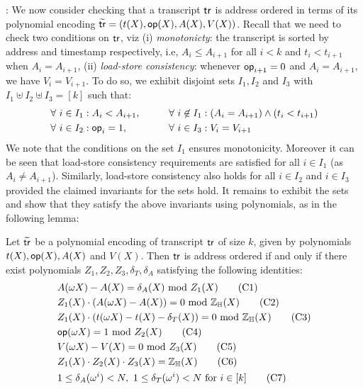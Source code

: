 : We now consider checking that a transcript $\mathsf{tr}$ is address ordered in terms of its polynomial encoding
$\widetilde{\mathsf{tr}}=(t(X),\mathsf{op}(X),A(X),V(X))$. Recall that we need to check two conditions on $\mathsf{tr}$, viz (i) {\em monotonicty}:
the transcript is sorted by address and timestamp respectively, i.e, $A_i\leq A_{i+1}$ for all $i < k$ and
$t_i < t_{i+1}$ when $A_i=A_{i+1}$, (ii) {\em load-store consistency}: whenever $\mathsf{op}_{i+1}=0$ and $A_i=A_{i+1}$,
we have $V_i=V_{i+1}$. To do so, we exhibit disjoint sets $I_1,I_2$ and $I_3$ with $I_1\uplus I_2\uplus I_3=[k]$ such that:
\begin{alignat*}{3}
&\forall \ i\in I_1 : A_i < A_{i+1}, && \quad && \forall \ i\not\in I_1 : (A_i = A_{i+1})\wedge (t_i < t_{i+1}) \\
&\forall \ i\in I_2 : \mathsf{op}_i = 1, && \quad && \forall \ i\in I_3 : V_i = V_{i+1}
\end{alignat*}
We note that the conditions on the set $I_1$ ensures monotonicity. Moreover it can be seen that
load-store consistency requirements are satisfied for all $i\in I_1$ (as $A_i\neq A_{i+1}$). Similarly,
load-store consistency also holds for all $i\in I_2$ and $i\in I_3$ provided the claimed invariants for the sets hold.
It remains to exhibit the sets and show that they satisfy the above invariants using polynomials, as in the following
lemma:
\begin{lemma}\label{lem:addr-ordered-transcript}
Let $\widetilde{\mathsf{tr}}$ be a polynomial encoding of transcript $\mathsf{tr}$ of size $k$, given by polynomials $t(X),\mathsf{op}(X),A(X)$ and $V(X)$.
Then $\mathsf{tr}$ is address ordered if and only if there exist polynomials $Z_1,Z_2,Z_3,\delta_T,\delta_A$ satisfying the
following identities:
\begin{align}\label{eq:load-store-consitency-constraints}
& A(\omega X) - A(X) = \delta_A(X) \text{ mod } Z_1(X) \tag{C1} \label{eq:C1} \\
& Z_1(X)\cdot (A(\omega X) - A(X)) = 0 \text{ mod } \mathbb{Z}_{\mathbb{H}}(X) \tag{C2} \label{eq:C2} \\
& Z_1(X)\cdot (t(\omega X) - t(X) -\delta_T(X)) = 0 \text{ mod } \mathbb{Z}_{\mathbb{H}}(X) \tag{C3} \label{eq:C3} \\
& \mathsf{op}(\omega X) = 1  \text{ mod } Z_2(X) \tag{C4} \label{eq:C4} \\
& V(\omega X) - V(X) = 0 \text{ mod } Z_3(X) \tag{C5} \label{eq:C5} \\
& Z_1(X)\cdot Z_2(X)\cdot Z_3(X) = \mathbb{Z}_{\mathbb{H}}(X) \tag{C6} \label{eq:C6} \\
& 1\leq \delta_A(\omega^i)<N,\ 1\leq \delta_T(\omega^i)<N \text{ for } i\in [k] \tag{C7} \label{eq:C7}
\end{align}
\end{lemma}




